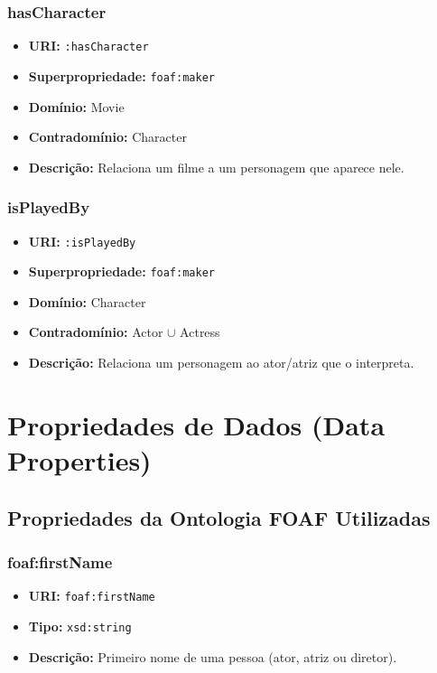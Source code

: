 \documentclass[12pt,a4paper]{article}
\begin{document}
\subsubsection{hasCharacter}
\begin{itemize}
    \item \textbf{URI:} \texttt{:hasCharacter}
    \item \textbf{Superpropriedade:} \texttt{foaf:maker}
    \item \textbf{Domínio:} Movie
    \item \textbf{Contradomínio:} Character
    \item \textbf{Descrição:} Relaciona um filme a um personagem que aparece nele.
\end{itemize}

\subsubsection{isPlayedBy}
\begin{itemize}
    \item \textbf{URI:} \texttt{:isPlayedBy}
    \item \textbf{Superpropriedade:} \texttt{foaf:maker}
    \item \textbf{Domínio:} Character
    \item \textbf{Contradomínio:} Actor $\cup$ Actress
    \item \textbf{Descrição:} Relaciona um personagem ao ator/atriz que o interpreta.
\end{itemize}

\section{Propriedades de Dados (Data Properties)}

\subsection{Propriedades da Ontologia FOAF Utilizadas}

\subsubsection{foaf:firstName}
\begin{itemize}
    \item \textbf{URI:} \texttt{foaf:firstName}
    \item \textbf{Tipo:} \texttt{xsd:string}
    \item \textbf{Descrição:} Primeiro nome de uma pessoa (ator, atriz ou diretor).
\end{itemize}
\end{document}
